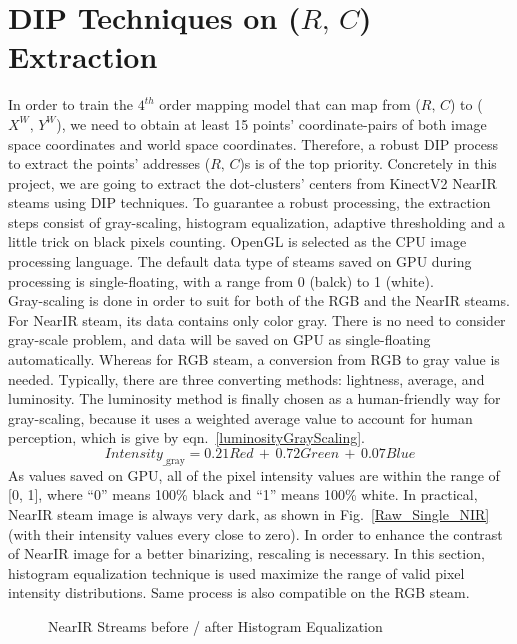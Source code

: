 \section{DIP Techniques on (\(R,\, C\)) Extraction}
\label{sectionDIPTechniques}
\noindent
In order to train the \(4^{th}\) order mapping model that can map from (\(R, \, C\)) to (\(X^W, \, Y^W\)), we need to obtain at least 15 points' coordinate-pairs of both image space coordinates and world space coordinates. Therefore, a robust DIP process to extract the points' addresses (\(R,\, C\))s is of the top priority. Concretely in this project, we are going to extract the dot-clusters' centers from KinectV2 NearIR steams using DIP techniques. To guarantee a robust processing, the extraction steps consist of gray-scaling, histogram equalization, adaptive thresholding and a little trick on black pixels counting. OpenGL is selected as the CPU image processing language. The default data type of steams saved on GPU during processing is single-floating, with a range from 0 (balck) to 1 (white). 
\\\indent
Gray-scaling is done in order to suit for both of the RGB and the NearIR steams. For NearIR steam, its data contains only color gray. There is no need to consider gray-scale problem, and data will be saved on GPU as single-floating automatically. Whereas for RGB steam, a conversion from RGB to gray value is needed. Typically, there are three converting methods: lightness, average, and luminosity. The luminosity method is finally chosen as a human-friendly way for gray-scaling, because it uses a weighted average value to account for human perception, which is give by eqn.~\ref{luminosityGrayScaling}.
\\\indent
%
\begin{equation}
Intensity_{\text{\_gray}} =  0.21 Red\,  + \, 0.72 Green \, + \, 0.07 Blue
\label{luminosityGrayScaling}
\end{equation}%
%
As values saved on GPU, all of the pixel intensity values are within the range of [0, 1], where \enquote{0} means 100\% black and \enquote{1}  means 100\% white. In practical, NearIR steam image is always very dark, as shown in Fig.~\ref{Raw_Single_NIR} (with their intensity values every close to zero).  In order to enhance the contrast of NearIR image for a better binarizing, rescaling is necessary. In this section, histogram equalization technique is used maximize the range of valid pixel intensity distributions. Same process is also compatible on the RGB steam.
%
 \begin{figure}[t]
\hspace*{-0.5cm}
\centering
{}
\caption{NearIR Streams before / after Histogram Equalization}
\label{Histogram_Equalization}
\end{figure}%
